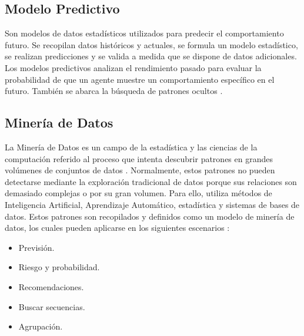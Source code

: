\subsection{Modelo Predictivo}

Son modelos de datos estadísticos utilizados para predecir el comportamiento futuro. Se recopilan datos históricos y actuales, se formula un modelo estadístico, se realizan predicciones y se valida a medida que se dispone de datos adicionales. Los modelos predictivos analizan el rendimiento pasado para evaluar la probabilidad de que un agente muestre un comportamiento específico en el futuro. También se abarca la búsqueda de patrones ocultos \parencite{gl_gartner2019pm}.

\subsection{Minería de Datos}

La Minería de Datos es un campo de la estadística y las ciencias de la computación referido al proceso que intenta descubrir patrones en grandes volúmenes de conjuntos de datos \parencite{bk_maimon2010datamining}. Normalmente, estos patrones no pueden detectarse mediante la exploración tradicional de datos porque sus relaciones son demasiado complejas o por su gran volumen. Para ello, utiliza métodos de Inteligencia Artificial, Aprendizaje Automático, estadística y sistemas de bases de datos. Estos patrones son recopilados y definidos como un modelo de minería de datos, los cuales pueden aplicarse en los siguientes escenarios \parencite{gl_microsoft2019datamining}:
\begin{itemize}
	\item Previsión.
	\item Riesgo y probabilidad.
	\item Recomendaciones.
	\item Buscar secuencias.
	\item Agrupación.
\end{itemize}

